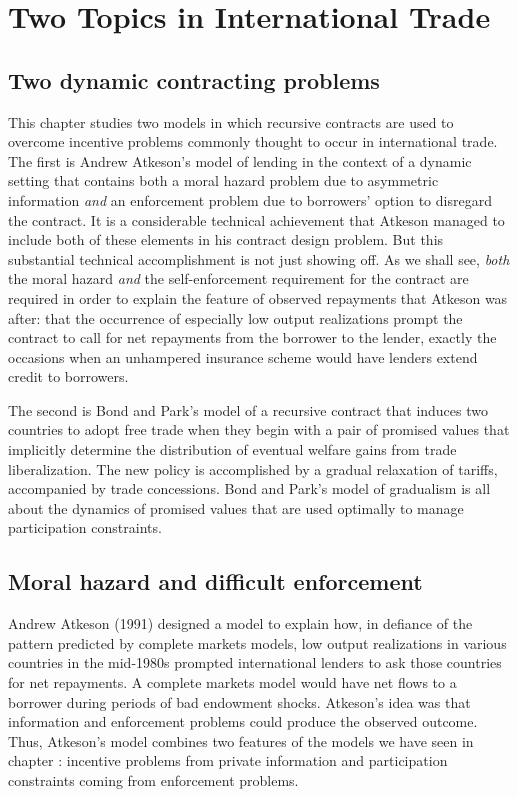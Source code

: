 


\chapter{Two Topics in International Trade\label{wldtrade}}
\section{Two dynamic contracting problems}

This chapter studies two models in which recursive contracts are
used to overcome incentive problems commonly thought to occur in
international trade.  The first is Andrew Atkeson's model of
lending in the context of a dynamic setting that contains both a
moral hazard problem due to asymmetric information {\it and\/} an
enforcement problem due to borrowers' option to disregard the
contract. It is a considerable technical achievement that Atkeson
managed to include both of these elements in his contract design
problem.  But this substantial technical accomplishment is not
just showing off. As we shall see, {\it both\/} the moral hazard
{\it and\/} the self-enforcement requirement for the contract are
required in order to explain the feature of observed repayments
that Atkeson was after: that the occurrence of especially low
output realizations prompt the contract to call for net repayments
from the borrower to the lender, exactly the occasions when an
unhampered insurance scheme would have lenders extend credit to
borrowers.

The  second is Bond and Park's model of a recursive contract that induces two countries
to adopt free trade when they begin with a pair of
 promised values that implicitly determine the distribution
of eventual welfare gains from trade liberalization.
The new
policy is accomplished by a gradual relaxation of tariffs, accompanied by
trade concessions.  Bond and Park's model of gradualism is all about the
dynamics of promised values that are used optimally to manage participation
constraints.
    
\section{Moral hazard and difficult enforcement}
Andrew Atkeson (1991) designed a model to explain how, in defiance
of the pattern predicted by complete markets models, low output
realizations in various countries in the mid-1980s prompted
international lenders to ask those countries for net repayments.  A complete
markets model would have net flows to a borrower during
periods of bad endowment shocks.  Atkeson's idea was that
information and enforcement problems could produce the
observed  outcome.  Thus,  Atkeson's model combines two
features of the  models we have seen in chapter :
incentive problems from private information and participation
constraints coming from enforcement problems.



